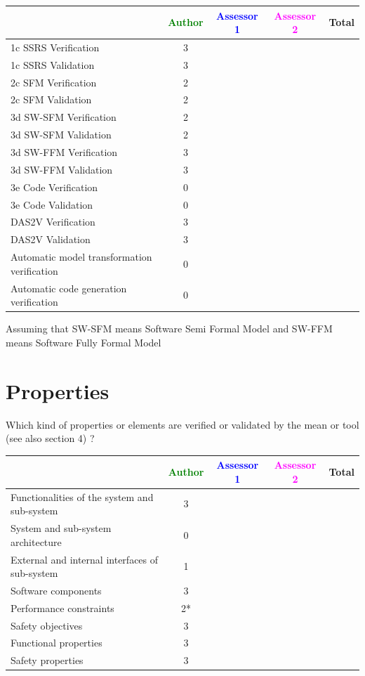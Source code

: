 \begin{tabular}{|l | c | c | c | c|}
\hline
& \textcolor{green}{Author} & \textcolor{blue}{Assessor 1} & \textcolor{magenta}{Assessor 2} & Total \\
\hline 
1c SSRS Verification & 3 & & &  \\
\hline
1c SSRS Validation & 3 & & &  \\
\hline
2c SFM Verification & 2 & & &  \\
\hline
2c SFM Validation & 2 & & &  \\
\hline
3d SW-SFM Verification & 2 & & &  \\
\hline
3d SW-SFM Validation & 2 & & &  \\
\hline
3d SW-FFM Verification & 3 & & &  \\
\hline
3d SW-FFM Validation & 3 & & &  \\
\hline
3e Code Verification & 0 & & &  \\
\hline
3e Code Validation & 0 & & &  \\
\hline
DAS2V Verification & 3 & & &  \\
\hline
DAS2V Validation & 3 & & &  \\
\hline
Automatic model transformation verification & 0 & & &  \\
\hline
Automatic code generation verification & 0 & & &  \\
\hline
\end{tabular}

\begin{author_comment}
	Assuming that SW-SFM means Software Semi Formal Model and SW-FFM means Software Fully Formal Model
\end{author_comment}

\section{Properties}

Which kind of properties or elements are verified or validated by the mean or tool (see also \citep{D4.1} section 4)  ?



\begin{tabular}{|l | c | c | c | c|}
\hline
& \textcolor{green}{Author} & \textcolor{blue}{Assessor 1} & \textcolor{magenta}{Assessor 2} & Total \\
\hline 
Functionalities of the system and sub-system & 3 & & &  \\
\hline
System and sub-system architecture & 0 & & &  \\
\hline
External and internal interfaces of sub-system & 1 & & &  \\
\hline
Software components & 3 & & &  \\
\hline
Performance constraints & 2* & & &  \\
\hline
Safety objectives & 3 & & &  \\
\hline
Functional properties & 3 & & &  \\
\hline
Safety properties & 3 & & &  \\
\hline
\end{tabular}

